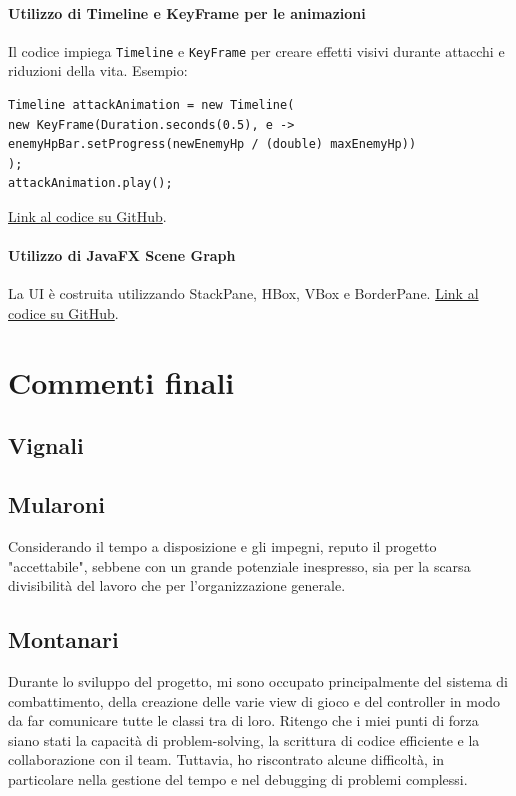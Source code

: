 \documentclass[a4paper,12pt]{report}
\begin{document}
\subsubsection{Utilizzo di Timeline e KeyFrame per le animazioni}
Il codice impiega \texttt{Timeline} e \texttt{KeyFrame} per creare effetti visivi durante attacchi e riduzioni della vita.\newline
Esempio:
\begin{verbatim}
Timeline attackAnimation = new Timeline(
new KeyFrame(Duration.seconds(0.5), e -> enemyHpBar.setProgress(newEnemyHp / (double) maxEnemyHp))
);
attackAnimation.play();
\end{verbatim}
\href{https://github.com/}{Link al codice su GitHub}.

\subsubsection{Utilizzo di JavaFX Scene Graph}
La UI è costruita utilizzando StackPane, HBox, VBox e BorderPane.\newline
\href{https://github.com/}{Link al codice su GitHub}.

\chapter{Commenti finali}

\section{Vignali}

\section{Mularoni}
Considerando il tempo a disposizione e gli impegni, reputo il progetto "accettabile", sebbene con un grande potenziale inespresso, sia per la scarsa divisibilità del lavoro che per l'organizzazione generale.

\section{Montanari}
Durante lo sviluppo del progetto, mi sono occupato principalmente del sistema di combattimento, della creazione delle varie view di gioco e del controller in modo da far comunicare tutte le classi tra di loro. Ritengo che i miei punti di forza siano stati la capacità di problem-solving, la scrittura di codice efficiente e la collaborazione con il team. Tuttavia, ho riscontrato alcune difficoltà, in particolare nella gestione del tempo e nel debugging di problemi complessi.
\end{document}
